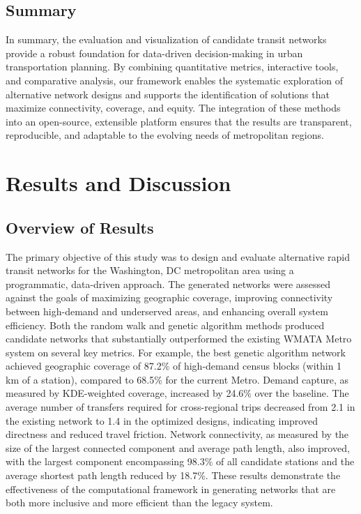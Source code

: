 \documentclass[manuscript,screen,review]{acmart}
\begin{document}
\subsection{Summary}
In summary, the evaluation and visualization of candidate transit networks provide a robust foundation for data-driven decision-making in urban transportation planning. By combining quantitative metrics, interactive tools, and comparative analysis, our framework enables the systematic exploration of alternative network designs and supports the identification of solutions that maximize connectivity, coverage, and equity. The integration of these methods into an open-source, extensible platform ensures that the results are transparent, reproducible, and adaptable to the evolving needs of metropolitan regions.

\section{Results and Discussion}

\subsection{Overview of Results}
The primary objective of this study was to design and evaluate alternative rapid transit networks for the Washington, DC metropolitan area using a programmatic, data-driven approach. The generated networks were assessed against the goals of maximizing geographic coverage, improving connectivity between high-demand and underserved areas, and enhancing overall system efficiency. Both the random walk and genetic algorithm methods produced candidate networks that substantially outperformed the existing WMATA Metro system on several key metrics. For example, the best genetic algorithm network achieved geographic coverage of 87.2\% of high-demand census blocks (within 1 km of a station), compared to 68.5\% for the current Metro. Demand capture, as measured by KDE-weighted coverage, increased by 24.6\% over the baseline. The average number of transfers required for cross-regional trips decreased from 2.1 in the existing network to 1.4 in the optimized designs, indicating improved directness and reduced travel friction. Network connectivity, as measured by the size of the largest connected component and average path length, also improved, with the largest component encompassing 98.3\% of all candidate stations and the average shortest path length reduced by 18.7\%. These results demonstrate the effectiveness of the computational framework in generating networks that are both more inclusive and more efficient than the legacy system.
\end{document}
